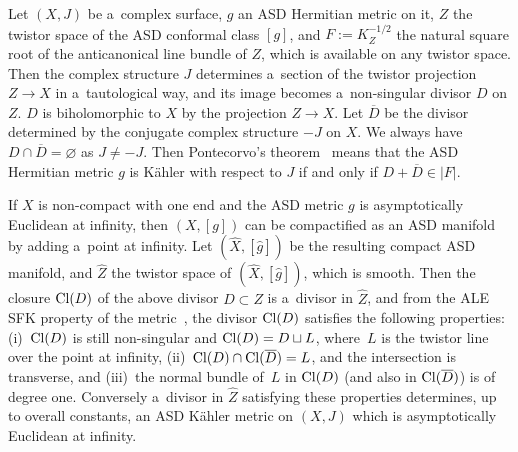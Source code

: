 \documentclass[pdftex]{sigma}
\numberwithin{equation}{section}
\begin{document}
Let $(X,J)$ be a~complex surface, $g$ an ASD Hermitian metric on it, $Z$ the twistor space of the ASD conformal class
$[g]$, and $F:=K_Z^{-1/2}$ the natural square root of the anticanonical line bundle of $Z$, which is available on any
twistor space.
Then the complex structure $J$ determines a~section of the twistor projection $Z\to X$ in a~tautological way, and its
image becomes a~non-singular divisor $D$ on $Z$.
$D$ is biholomorphic to $X$ by the projection $Z\to X$.
Let $\overline D$ be the divisor determined by the conjugate complex structure $-J$ on $X$.
We always have $D\cap \overline D=\varnothing$ as $J\neq -J$.
Then Pontecorvo's theorem~\cite{Pont92} means that the ASD Hermitian metric $g$ is K\"ahler with respect to $J$ if and
only if $D + \overline D\in |F|$.

If $X$ is non-compact with one end and the ASD metric $g$ is asymptotically Euclidean at inf\/inity, then $(X,[g])$ can
be compactif\/ied as an ASD manifold by adding a~point at inf\/inity.
Let $(\hat X,[\hat g])$ be the resulting compact ASD manifold, and $\hat Z$ the twistor space of $(\hat X, [\hat g])$,
which is smooth.
Then the closure ${\rm{Cl}}(D)$ of the above divisor $D\subset Z$ is a~divisor in $\hat Z$, and from the ALE SFK
property of the metric~\cite[proof of Proposition~6, p.~312]{LB92}, the divisor ${\rm{Cl}}(D)$ satisf\/ies the following
properties: (i)~${\rm{Cl}}(D)$ is still non-singular and ${\rm{Cl}}(D) = D\sqcup L$, where~$L$ is the twistor line over
the point at inf\/inity, (ii)~${\rm{Cl}}(D)\cap {\rm{Cl}}(\overline D)=L$, and the intersection is transverse, and (iii)~the normal bundle of~$L$ in ${\rm{Cl}}(D)$ (and also in ${\rm{Cl}}(\overline D)$) is of degree one.
Conversely a~divisor in $\hat Z$ satisfying these properties determines, up to overall constants, an ASD K\"ahler metric
on $(X,J)$ which is asymptotically Euclidean at inf\/inity.
\end{document}
